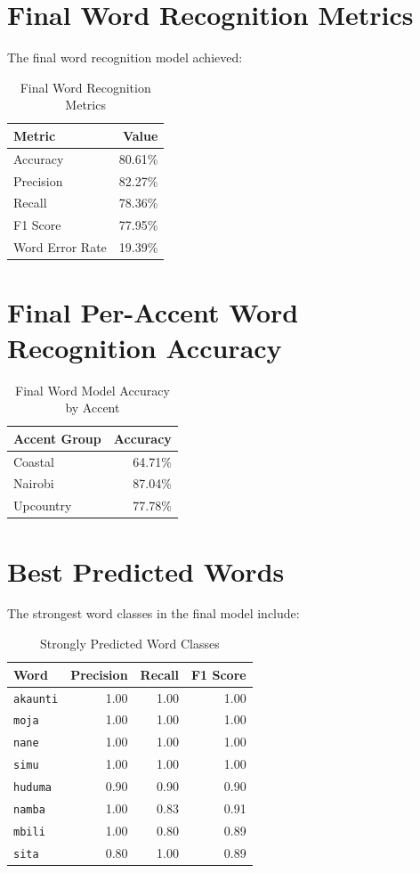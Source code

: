 \documentclass[12pt,a4paper]{report}
\begin{document}
\section{Final Word Recognition Metrics}
The final word recognition model achieved:

\begin{table}[h]
\centering
\caption{Final Word Recognition Metrics}
\begin{tabular}{lr}
\toprule
\textbf{Metric} & \textbf{Value} \\
\midrule
Accuracy & 80.61\% \\
Precision & 82.27\% \\
Recall & 78.36\% \\
F1 Score & 77.95\% \\
Word Error Rate & 19.39\% \\
\bottomrule
\end{tabular}
\end{table}

\section{Final Per-Accent Word Recognition Accuracy}
\begin{table}[h]
\centering
\caption{Final Word Model Accuracy by Accent}
\begin{tabular}{lr}
\toprule
\textbf{Accent Group} & \textbf{Accuracy} \\
\midrule
Coastal & 64.71\% \\
Nairobi & 87.04\% \\
Upcountry & 77.78\% \\
\bottomrule
\end{tabular}
\end{table}

\section{Best Predicted Words}
The strongest word classes in the final model include:

\begin{table}[h]
\centering
\caption{Strongly Predicted Word Classes}
\begin{tabular}{lrrr}
\toprule
\textbf{Word} & \textbf{Precision} & \textbf{Recall} & \textbf{F1 Score} \\
\midrule
\texttt{akaunti} & 1.00 & 1.00 & 1.00 \\
\texttt{moja} & 1.00 & 1.00 & 1.00 \\
\texttt{nane} & 1.00 & 1.00 & 1.00 \\
\texttt{simu} & 1.00 & 1.00 & 1.00 \\
\texttt{huduma} & 0.90 & 0.90 & 0.90 \\
\texttt{namba} & 1.00 & 0.83 & 0.91 \\
\texttt{mbili} & 1.00 & 0.80 & 0.89 \\
\texttt{sita} & 0.80 & 1.00 & 0.89 \\
\bottomrule
\end{tabular}
\end{table}
\end{document}
